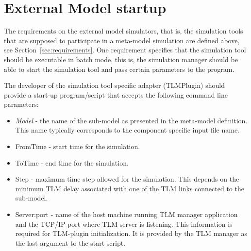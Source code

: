 \section{External Model startup}
The requirements on the external model simulators, that is, the
simulation tools that are supposed to participate in a meta-model
simulation are defined above, see Section~\ref{sec:requirements}. One
requirement specifies that the simulation tool should be executable in
batch mode, this is, the simulation manager should be able to start
the simulation tool and pass certain parameters to the program.

The developer of the simulation tool specific adapter (TLMPlugin)
should provide a start-up program/script that accepts the following
command line parameters:
\begin{itemize}
\item \emph{Model} - the name of the sub-model as presented in the
meta-model definition. This name typically corresponds to the
component specific input file name.
\item {FromTime} - start time for the simulation.
\item {ToTime} - end time for the simulation.
\item {Step} - maximum time step allowed for the simulation. This depends on
the minimum TLM delay associated with one of the TLM links connected to the sub-model.
\item {Server:port} - name of the host machine running TLM manager application and
the TCP/IP port where TLM server is listening. This information is required for
TLM-plugin initialization. It is provided by the TLM manager as the last
argument to the start script.
\end{itemize}

